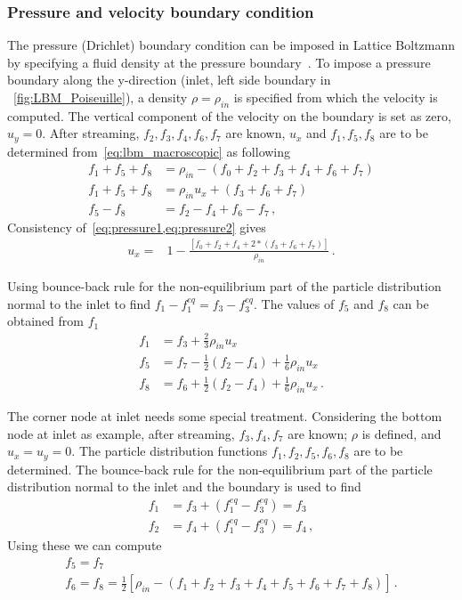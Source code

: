 \subsubsection*{Pressure and velocity boundary condition}

The pressure (Drichlet) boundary condition can be imposed in 
Lattice Boltzmann by specifying a fluid density at the pressure 
boundary~\citep{Zou1997}. To impose a pressure boundary along 
the y-direction (inlet, left side boundary in
~\cref{fig:LBM_Poiseuille}), a density $\rho = \rho_{in}$ is 
specified from which the velocity is computed. The 
vertical component of the velocity on the boundary is set as 
zero, $u_y=0$. After streaming, $f_2, f_3, f_4, f_6, f_7$ are 
known, $u_x$ and $f_1, f_5, f_8$ are to be determined 
from~\cref{eq:lbm_macroscopic} as following
%
\begin{align}
 f_1+f_5+f_8 & =  \rho_{in} - (f_0+f_2+f_3+f_4+f_6+f_7) 
 \label{eq:pressure1}\\
 f_1+f_5+f_8 & =  \rho_{in}u_x + (f_3+f_6+f_7) 
 \label{eq:pressure2} \\
 f_5 - f_8  & =  f_2 - f_4 +f_6 -f_7\,,
\end{align}
%
\noindent Consistency of~\cref{eq:pressure1,eq:pressure2} gives
%
\begin{align}
u_x  = & 1 - \frac{[f_0+f_2+f_4+2*(f_3+f_6+f_7)]}{\rho_{in}}\,.
\end{align}

Using bounce-back rule for the non-equilibrium part of the 
particle distribution normal to the inlet to find $f_1 
-f_1^{eq} = f_3 -f_3^{eq}$. The values of $f_5$ and $f_8$ can 
be obtained from $f_1$
%
\begin{align}
f_1 & = f_3 + \frac{2}{3} \rho_{in}u_x \nonumber \\ 
f_5 & = f_7 - \frac{1}{2}(f_2 - f_4) + \frac{1}{6}\rho_{in}u_x\nonumber \\ 
f_8 & = f_6 + \frac{1}{2}(f_2 - f_4) + \frac{1}{6}\rho_{in}u_x\,.
\end{align}

The corner node at inlet needs some special treatment. 
Considering the bottom node at inlet as example, after 
streaming, $f_3, f_4, f_7$ are known; $\rho$ is 
defined, and $u_x = u_y = 0$. The particle distribution 
functions $f_1, f_2, f_5, f_6, f_8$ are to be determined. The 
bounce-back rule for the non-equilibrium part of the particle 
distribution normal to the inlet and the boundary is used to 
find
%
\begin{align}
f_1 & = f_3 + (f_1^{eq}-f_3^{eq}) = f_3 \\
f_2 & = f_4 + (f_1^{eq}-f_3^{eq}) = f_4 \,,
\end{align}
%
\noindent Using these we can compute
%
\begin{gather}
f_5 = f_7 \\
f_6 = f_8 = \frac{1}{2}[\rho_{in} - (f_1 + f_2 + f_3 + f_4 + f_5 + f_6 + f_7 + 
f_8)]\,.
\end{gather}

